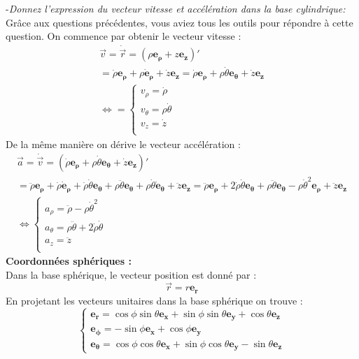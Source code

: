 \documentclass[a4paper,10pt,twoside]{article}
\begin{document}
\noindent -\textit{Donnez l'expression du vecteur vitesse et accélération dans la base cylindrique: } \\
Grâce aux questions précédentes, vous aviez tous les outils pour répondre à cette question. On commence par obtenir le vecteur vitesse : 
\begin{gather*}  
    \vec v= \dot {\vec r} = (\rho\mathbf{ e_\rho} + z\mathbf{ e_z})' \\
    = \dot\rho\mathbf{ e_\rho} + \rho\mathbf{ \dot{e}_\rho}+ \dot z \mathbf{ e_z} =  \dot\rho\mathbf{ e_\rho} + \rho\dot\theta\mathbf{e_\theta}+ \dot z \mathbf{e_z} \\
    \iff  = \begin{cases}
     v_\rho = \dot\rho\\
     v_\theta = \rho \dot \theta\\
     v_z = \dot z \\
\end{cases}  
\end{gather*}
De la même manière on dérive le vecteur accélération :
\begin{gather*}  
    \vec a= \dot {\vec v} =(  \dot\rho\mathbf{ e_\rho} + \rho\dot\theta\mathbf{e_\theta}+ \dot z \mathbf{e_z})' \\
    = \ddot\rho\mathbf{ e_\rho} + \dot\rho\mathbf{ \dot{e}_\rho}+ \dot\rho\dot\theta\mathbf{e_\theta}+\rho\ddot\theta\mathbf{e_\theta}+ \rho\dot\theta\mathbf{ \dot{e}_\theta}+\ddot z \mathbf{ e_z} =  \ddot\rho\mathbf{ e_\rho} + 2\dot\rho\dot\theta\mathbf{ {e}_\theta}+ \rho\ddot\theta\mathbf{e_\theta} -\rho\dot\theta^2\mathbf{ {e}_\rho}+\ddot z \mathbf{ e_z}\\
    \iff   \begin{cases}
     a_\rho = \ddot\rho-\rho\dot\theta^2\\
     a_\theta = \rho\ddot\theta+2\dot\rho\dot\theta\\
     a_z = \ddot z \\
\end{cases}  
\end{gather*}
\noindent\textbf{Coordonnées sphériques : }\\
Dans la base sphérique, le vecteur position est donné par : \begin{equation*}
    \vec r = r\mathbf{ e_r}
\end{equation*}
En projetant les vecteurs unitaires dans la base sphérique on trouve  :
\begin{equation*}
    \begin{cases}
         \mathbf{ e_r} = \cos{\phi}\sin{\theta} \mathbf{ e_x}+\sin{\phi}\sin{\theta} \mathbf{ e_y}+\cos{\theta} \mathbf{ e_z} \\
         \mathbf{ e_\phi}=-\sin{\phi} \mathbf{ e_x}+\cos{\phi} \mathbf{ e_y} \\
         \mathbf{ e_\theta}= \cos{\phi}\cos{\theta} \mathbf{ e_x}+\sin{\phi}\cos{\theta} \mathbf{ e_y}-\sin{\theta} \mathbf{ e_z}
    \end{cases}
\end{equation*}
\end{document}
